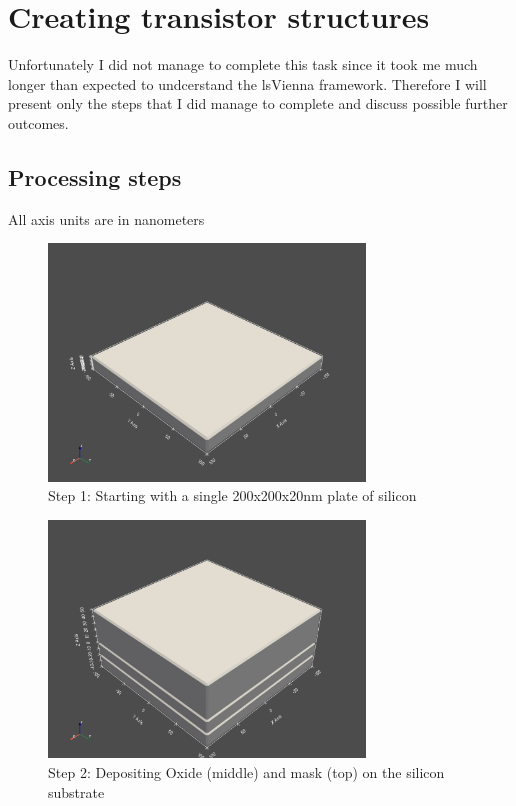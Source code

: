 \section{Creating transistor structures}
Unfortunately I did not manage to complete this task since it took me much longer than expected to undcerstand the lsVienna framework.
Therefore I will present only the steps that I did manage to complete and discuss possible further outcomes.

\subsection{Processing steps}
All axis units are in nanometers

\begin{figure}[H]
	\centering
	\includegraphics[width=0.75\textwidth]{res/task3_1_oxide_deposition.png}
	\caption{Step 1: Starting with a single 200x200x20nm plate of silicon}
\end{figure}

\begin{figure}[H]
	\centering
	\includegraphics[width=0.75\textwidth]{res/task3_2_silicon_deposition.png}
	\caption{Step 2: Depositing Oxide (middle) and mask (top) on the silicon substrate}
\end{figure}

